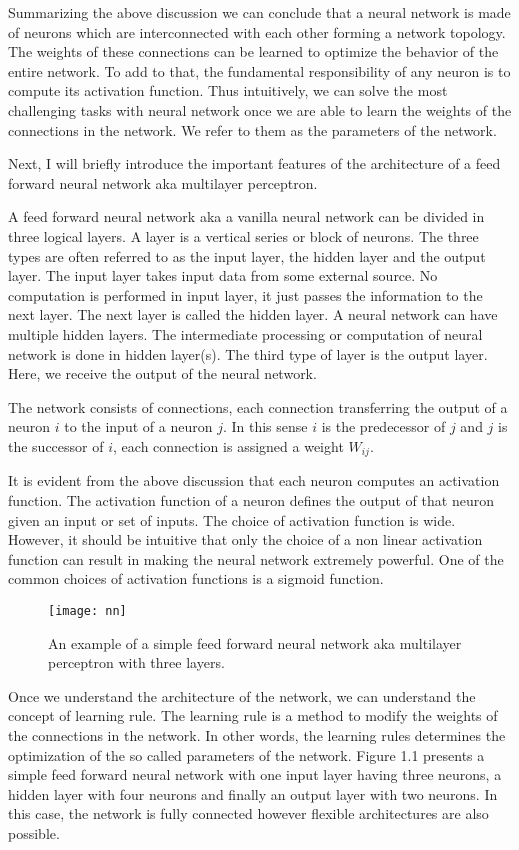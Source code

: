 Summarizing the above discussion we can conclude that a neural network is made of neurons which are interconnected with each other forming a network topology. The weights of these connections can be learned to optimize the behavior of the entire network. To add to that, the fundamental responsibility of any neuron is to compute its activation function. Thus intuitively, we can solve the most challenging tasks with neural network once we are able to learn the weights of the connections in the network. We refer to them as the parameters of the network.
 
Next, I will briefly introduce the important features of the architecture of a feed forward neural network aka multilayer perceptron.

A feed forward neural network aka a vanilla neural network can be divided in three logical layers. A layer is a vertical series or block of neurons. The three types are often referred to as the input layer, the hidden layer and the output layer. The input layer takes input data from some external source. No computation is performed in input layer, it just passes the information to the next layer. The next layer is called the hidden layer. A neural network can have multiple hidden layers. The intermediate processing or computation of neural network is done in hidden layer(s). The third type of layer is the output layer. Here, we receive the output of the neural network. 

The network consists of connections, each connection transferring the output of a neuron $i$ to the input of a neuron $j$. In this sense $i$ is the predecessor of $j$ and $j$ is the successor of $i$, each connection is assigned a weight $W_{ij}$.

It is evident from the above discussion that each neuron computes an activation function. The activation function of a neuron defines the output of that neuron given an input or set of inputs. The choice of activation function is wide. However, it should be intuitive that only the choice of a non linear activation function can result in making the neural network extremely powerful. One of the common choices of  activation functions is a sigmoid function. 

\begin{figure}
\centering
\texttt{[image: nn]}
\caption{An example of a simple feed forward neural network aka multilayer perceptron with three layers.}
\end{figure}

Once we understand the architecture of the network, we can understand the concept of learning rule. The learning rule is a method to modify the weights of the connections in the network. In other words, the learning rules determines the optimization of the so called parameters of the network. Figure 1.1 presents a simple feed forward neural network with one input layer having three neurons, a hidden layer with four neurons and finally an output layer with two neurons. In this case, the network is fully connected however flexible architectures are also possible. 

